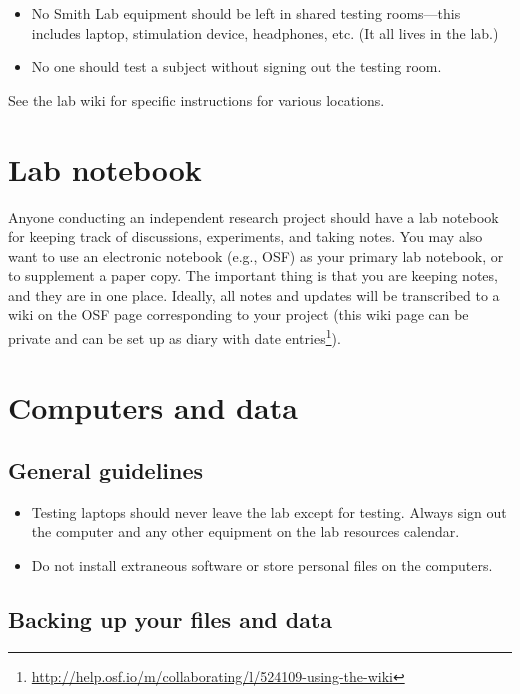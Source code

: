 \documentclass[letterpaper,12pt,oneside]{memoir}
\begin{document}
{\begin{itemize}
\item No Smith Lab equipment should be left in shared testing rooms---this includes laptop, stimulation device, headphones, etc. (It all lives in the lab.)

\item No one should test a subject without signing out the testing room.
\end{itemize}

See the lab wiki for specific instructions for various locations.



\section{Lab notebook}
\label{sec:lab_notebook}

Anyone conducting an independent research project should have a lab notebook for keeping track of discussions, experiments, and taking notes. You may also want to use an electronic notebook (e.g., OSF) as your primary lab notebook, or to supplement a paper copy. The important thing is that you are keeping notes, and they are in one place. Ideally, all notes and updates will be transcribed to a wiki on the OSF page corresponding to your project (this wiki page can be private and can be set up as diary with date entries\footnote{\url{http://help.osf.io/m/collaborating/l/524109-using-the-wiki}}).

\section{Computers and data}

\subsection{General guidelines}

\begin{itemize}
\item Testing laptops should never leave the lab except for testing. Always sign out the computer and any other equipment on the lab resources calendar.
\item Do not install extraneous software or store personal files on the computers.
\end{itemize}

\subsection{Backing up your files and data}

}
\end{document}
